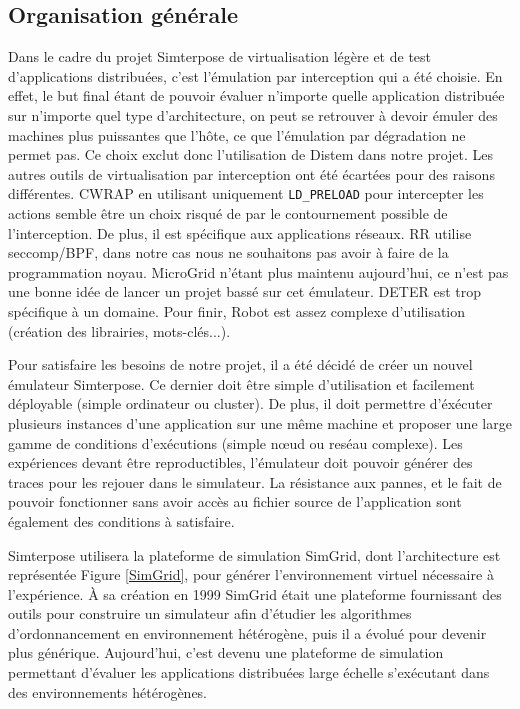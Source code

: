 \subsection{Organisation générale}

Dans le cadre du projet Simterpose de virtualisation légère et de test
d'applications distribuées, c'est l'émulation par interception qui a été
choisie. En effet, le but final étant de pouvoir évaluer n'importe quelle
application distribuée sur n'importe quel type d'architecture, on peut se
retrouver à devoir émuler des machines plus puissantes que l'hôte, ce que
l'émulation par dégradation ne permet pas. Ce choix exclut donc l'utilisation de
Distem dans notre projet. Les autres outils de virtualisation par interception
ont été écartées pour des raisons différentes. CWRAP en utilisant uniquement
\texttt{LD\_PRELOAD} pour intercepter les actions semble être un choix risqué de
par le contournement possible de l'interception. De plus, il est spécifique aux
applications réseaux. RR utilise seccomp/BPF, dans notre cas nous ne souhaitons
pas avoir à faire de la programmation noyau. MicroGrid n'étant plus maintenu
aujourd'hui, ce n'est pas une bonne idée de lancer un projet bassé sur cet
émulateur. DETER est trop spécifique à un domaine. Pour finir, Robot est assez
complexe d'utilisation (création des librairies, mots-clés...).

Pour satisfaire les besoins de notre projet, il a été décidé de créer un nouvel
émulateur Simterpose. Ce dernier doit être simple d'utilisation et facilement
déployable (simple ordinateur ou cluster).  De plus, il doit permettre
d'éxécuter plusieurs instances d'une application sur une même machine et
proposer une large gamme de conditions d'exécutions (simple n\oe ud ou reséau
complexe). Les expériences devant être reproductibles, l'émulateur doit pouvoir
générer des traces pour les rejouer dans le simulateur. La résistance aux
pannes, et le fait de pouvoir fonctionner sans avoir accès au fichier source de
l'application sont également des conditions à satisfaire.

Simterpose utilisera la plateforme de simulation SimGrid, dont l'architecture
est représentée Figure \ref{SimGrid}, pour générer l'environnement virtuel
nécessaire à l'expérience. À sa création en 1999 SimGrid
\citep{CASANOVA:SimGrid} était une plateforme fournissant des outils pour
construire un simulateur afin d'étudier les algorithmes d'ordonnancement en
environnement hétérogène, puis il a évolué \citep{MARTIN:SimGrid} pour devenir
plus générique. Aujourd'hui, c'est devenu une plateforme de simulation
permettant d'évaluer les applications distribuées large échelle s'exécutant dans
des environnements hétérogènes.
 
